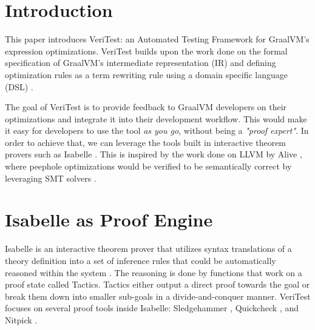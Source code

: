 \documentclass[conference,a4paper,english,10pt]{IEEEtran}[2015/08/26]
\begin{document}
\section{Introduction}
\label{sec:introduction}



This paper introduces VeriTest: an Automated Testing Framework for GraalVM's expression optimizations. VeriTest builds upon the work done on 
the formal specification of GraalVM's intermediate representation (IR) \cite{ATVA21_GraalVM_IR_Semantics} and defining optimization rules as a term 
rewriting rule using a domain specific language (DSL) \cite{Term_Graph_Optimizations}. 

The goal of VeriTest is to provide feedback to GraalVM \cite{graal} developers on their optimizations and integrate it into their development workflow. 
This would make it easy for developers to use the tool \emph{as you go}, without being a \emph{"proof expert"}.
In order to achieve that, we can leverage the tools built in interactive theorem provers such as Isabelle \cite{isabelleProof}.
This is inspired by the work done on LLVM by Alive \cite{AliveInLean}, where peephole optimizations would be verified to be semantically 
correct by leveraging SMT solvers \cite[Sec. 3.1.1]{AliveInLean}.

\section{Isabelle as Proof Engine}
\label{sec:Isabelle}

Isabelle is an interactive theorem prover that utilizes syntax translations of a theory definition into a set of inference rules that could be 
automatically reasoned within the system \cite{isabelleProof}. The reasoning is done by functions that work on a proof state called Tactics. 
Tactics either output a direct proof towards the goal or break them down into smaller sub-goals in a divide-and-conquer manner. VeriTest focuses 
on several proof tools inside Isabelle: Sledgehammer \cite[Sec. 3]{isabelleProof}, Quickcheck \cite[Sec. 4]{isabelleProof}, 
and Nitpick \cite[Sec. 5]{isabelleProof}.
\end{document}
